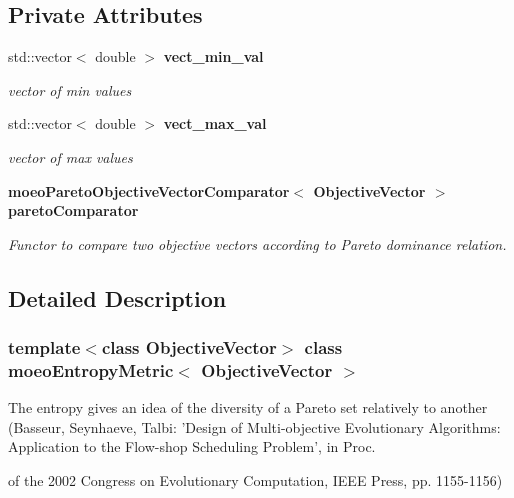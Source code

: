 \subsection*{Private Attributes}
\begin{CompactItemize}
\item 
std::vector$<$ double $>$ \bf{vect\_\-min\_\-val}\label{classmoeoEntropyMetric_e423d7d4416ef371ce7b0fd24c3212f8}

\begin{CompactList}\small\item\em vector of min values \item\end{CompactList}\item 
std::vector$<$ double $>$ \bf{vect\_\-max\_\-val}\label{classmoeoEntropyMetric_f5fad6d144520fd1403f774f98b18b99}

\begin{CompactList}\small\item\em vector of max values \item\end{CompactList}\item 
\bf{moeo\-Pareto\-Objective\-Vector\-Comparator}$<$ Objective\-Vector $>$ \bf{pareto\-Comparator}\label{classmoeoEntropyMetric_227ce550253c35957300c6e11730c847}

\begin{CompactList}\small\item\em Functor to compare two objective vectors according to Pareto dominance relation. \item\end{CompactList}\end{CompactItemize}


\subsection{Detailed Description}
\subsubsection*{template$<$class Objective\-Vector$>$ class moeo\-Entropy\-Metric$<$ Objective\-Vector $>$}

The entropy gives an idea of the diversity of a Pareto set relatively to another (Basseur, Seynhaeve, Talbi: 'Design of Multi-objective Evolutionary Algorithms: Application to the Flow-shop Scheduling Problem', in Proc. 

of the 2002 Congress on Evolutionary Computation, IEEE Press, pp. 1155-1156) 



